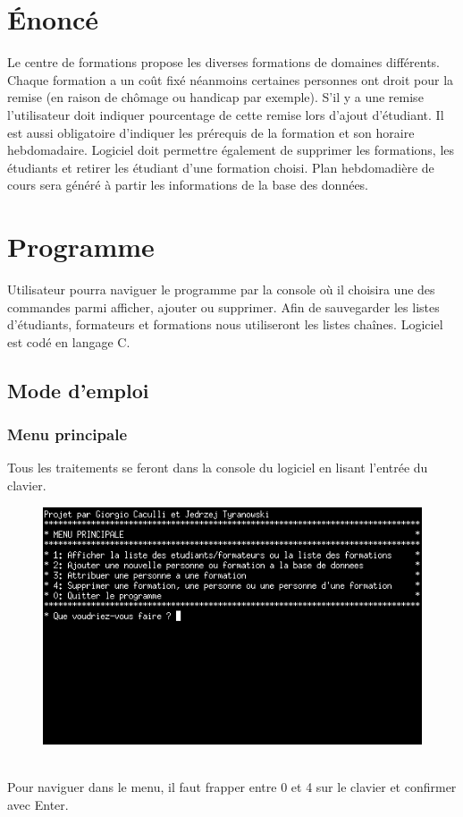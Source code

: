 \documentclass[11pt]{article}
\begin{document}
\newpage
\section{Énoncé}
Le centre de formations propose les diverses formations de domaines différents. 
Chaque formation a un coût fixé néanmoins certaines personnes ont droit pour la remise (en raison de chômage ou handicap par exemple). S’il y a une remise l’utilisateur doit indiquer pourcentage de cette remise lors d’ajout d’étudiant. Il est aussi obligatoire d’indiquer les prérequis de la formation et son horaire hebdomadaire. Logiciel doit permettre également de supprimer les formations, les étudiants et retirer les étudiant d’une formation choisi. 
Plan hebdomadière de cours sera généré à partir les informations de la base des données.

\newpage
\section{Programme}
Utilisateur pourra naviguer le programme par la console où il choisira une des commandes parmi afficher, ajouter ou supprimer. Afin de sauvegarder les listes d’étudiants, formateurs et formations nous utiliseront les listes chaînes. Logiciel est codé en langage C.
\subsection{Mode d'emploi}
\subsubsection{Menu principale}
Tous les traitements se feront dans la console du logiciel en lisant l'entrée du clavier.
\begin{figure}[ht]
  \centering
  \includegraphics[trim=0 150 0 0, clip, width=\textwidth]{images/01.png}
\end{figure}\\
Pour naviguer dans le menu, il faut frapper entre 0 et 4 sur le clavier et confirmer avec Enter.
\end{document}
